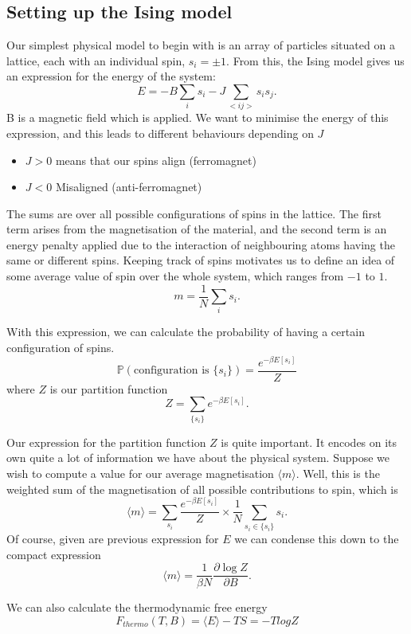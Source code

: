 \subsection{Setting up the Ising model}
Our simplest physical model to begin with is an array of particles situated on a lattice, each with an individual spin, $s_i = \pm 1 $. From this, the Ising model gives us an expression for the energy of the system:
\[ 
	E = - B \sum_i s_i - J \sum_{<ij>} s_i s_j. 
\]
B is a magnetic field which is applied. We want to minimise the energy of this expression, and this leads to different behaviours depending on $J$ 
\begin{itemize} 
	\item $J > 0$ means that our spins align (ferromagnet) 
	\item $J < 0$ Misaligned (anti-ferromagnet) 
\end{itemize}  
The sums are over all possible configurations of spins in the lattice. The first term arises from the magnetisation of the material, and the second term is an energy penalty applied due to the interaction of neighbouring atoms having the same or different spins. 
Keeping track of spins motivates us to define an idea of some average value of spin over the whole system, which ranges from $-1$ to $1$. 
\[
	m = \frac{1}{N} \sum_{i} s_i. 
\]


With this expression, we can calculate the probability of having a certain configuration of spins. 
\[
	\mathbb{P}(\text{configuration is } \{ s_i \}) = \frac{e^{ - \beta E[s_i]}}{Z}
\]
where $Z$ is our partition function 
\[ 
	Z = \sum_{\{ s_i \}} e^{ - \beta E[s_i] }. 
\]

Our expression for the partition function $Z$ is quite important. It encodes on its own quite a lot of information we have about the physical system. Suppose we wish to compute a value for our average magnetisation $\langle m \rangle$. Well, this is the weighted sum of the magnetisation of all possible contributions to spin, which is
\[ 
	 \langle m \rangle  = \sum_{s_i} \frac{e^{- \beta E[s_i]}}{Z} \times \frac{1}{N} \sum_{s_i \in \{ s_i\} } s_i. 
\] 
Of course, given are previous expression for $E$ we can condense this down to the compact expression 
\[ 
	\langle  m \rangle = \frac{1}{\beta N} \frac{\partial \log Z}{\partial B}. 
\] 

We can also calculate the thermodynamic free energy 
\[ 
	F_{thermo} (T, B)  = \langle E \rangle  - TS  = - T log Z 
\] 

